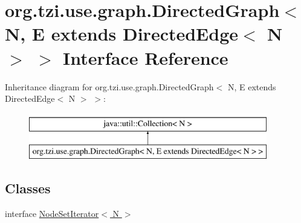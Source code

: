 \hypertarget{interfaceorg_1_1tzi_1_1use_1_1graph_1_1_directed_graph_3_01_n_00_01_e_01extends_01_directed_edge_3_01_n_01_4_01_4}{\section{org.\-tzi.\-use.\-graph.\-Directed\-Graph$<$ N, E extends Directed\-Edge$<$ N $>$ $>$ Interface Reference}
\label{interfaceorg_1_1tzi_1_1use_1_1graph_1_1_directed_graph_3_01_n_00_01_e_01extends_01_directed_edge_3_01_n_01_4_01_4}
}
Inheritance diagram for org.\-tzi.\-use.\-graph.\-Directed\-Graph$<$ N, E extends Directed\-Edge$<$ N $>$ $>$\-:\begin{figure}[H]
\begin{center}
\leavevmode
\includegraphics[height=2.000000cm]{interfaceorg_1_1tzi_1_1use_1_1graph_1_1_directed_graph_3_01_n_00_01_e_01extends_01_directed_edge_3_01_n_01_4_01_4}
\end{center}
\end{figure}
\subsection*{Classes}
\begin{DoxyCompactItemize}
\item 
interface \hyperlink{interfaceorg_1_1tzi_1_1use_1_1graph_1_1_directed_graph_3_01_n_00_01_e_01extends_01_directed_edgef24c26bac106239dae1087a8e5c4f73c}{Node\-Set\-Iterator$<$ N $>$}
\end{DoxyCompactItemize}
